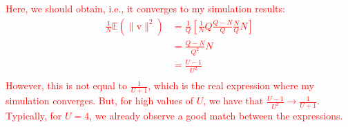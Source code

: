 \documentclass[12pt]{article}
\newcommand{\vect}[1]{\boldsymbol{\mathrm{#1}}}
\begin{document}
\textcolor{red}{Here, we should obtain, i.e., it converges to my simulation results:
\begin{align*}
\frac{1}{N}\mathbb{E}\left(\|\vect{v}\|^2\right)&= \frac{1}{Q} \left[ \frac{1}{N} Q   \frac{Q-N}{Q} \frac{N}{Q} N \right] \\
&=   \frac{Q-N}{Q^2} N   \\
&= \frac{U-1}{U^2} \\
\end{align*}
However, this is not equal to $\frac{1}{U+1}$, which is the real expression where my simulation converges. But, for high values of $U$, we have that $\frac{U-1}{U^2} \to \frac{1}{U+1}$. Typically, for $U=4$, we already observe a good match between the expressions.}
\end{document}
